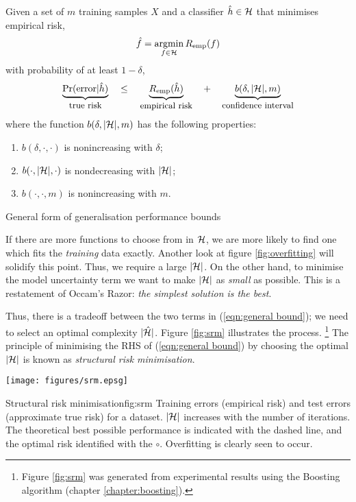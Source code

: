 \begin{linefigure}
Given a set of $m$ training samples $X$ and a classifier $\hat{h} \in \mathcal{H}$
that minimises empirical risk,
\begin{equation*}
\hat{f} = \argmin_{f \in
\calH} R_{\emp}(f)
\end{equation*}
with probability of at least $1 - \delta$,
%
\begin{equation}
\underbrace{\Pr(\mathrm{error}|\hat{h})}_{\mbox{\small{true risk}}}
\quad \leq \quad
\underbrace{R_{\mathrm{emp}}(\hat{h})}_{\mbox{\small{empirical risk}}}
\quad + \quad
\underbrace{b(\delta, |\mathcal{H}|, m)}_{\mbox{\small{confidence interval}}}
\label{eqn:general bound}
\end{equation}
%
where the function $b(\delta, |\mathcal{H}|, m)$ has the following
properties:
\begin{enumerate}
\item	$b(\delta, \cdot, \cdot)$ is nonincreasing with $\delta$;
\item	$b(\cdot, |\mathcal{H}|, \cdot)$ is nondecreasing with $|\mathcal{H}|$;
\item	$b(\cdot, \cdot, m)$ is nonincreasing with $m$.
\end{enumerate}
\caption{General form of generalisation performance bounds}
\label{fig:generalisation bound form}
\end{linefigure}

If there are more functions to choose from in $\mathcal{H}$, we
are more likely to find one which fits the \emph{training} data
exactly.  Another look at figure \ref{fig:overfitting} will solidify
this point.  Thus, we require a large $|\mathcal{H}|$.  On the other hand,
to minimise the model uncertainty term we want to make $|\mathcal{H}|$ as
\emph{small} as possible.  This is a restatement of Occam's Razor: \emph{the simplest solution is the best}.

Thus, there is a tradeoff between the two terms in (\ref{eqn:general
bound}); we need to select an optimal complexity $|\hat{\mathcal{H}}|$.
Figure \ref{fig:srm} illustrates the process.
\footnote{Figure \ref{fig:srm} was generated from experimental results
using the Boosting algorithm (chapter \ref{chapter:boosting}).}
The principle of minimising the RHS of (\ref{eqn:general bound}) by
choosing the optimal $|\mathcal{H}|$ is known as \emph{structural risk
minimisation}.

\begin{linefigure}
\begin{center}
\texttt{[image: figures/srm.epsg]}
\end{center}
\begin{capt}{Structural risk minimisation}{fig:srm}
Training errors (empirical risk) and test errors (approximate true
risk) for a dataset.  $|\mathcal{H}|$ increases with the number of
iterations.  The theoretical best possible performance is
indicated with the dashed line, and the optimal risk identified with
the $\circ$.  Overfitting is clearly seen to occur.
\end{capt}
\end{linefigure}


